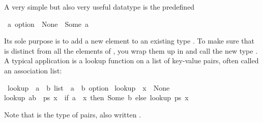 \begin{isabellebody}
\begin{isamarkuptxt}
A very simple but also very useful datatype is the predefined
\begin{isabelle}%
\ {}a\ option\ {}\ None\ {}\ Some\ {}a%
\end{isabelle}
Its sole purpose is to add a new element  to an existing
type . To make sure that  is distinct from all the
elements of , you wrap them up in  and call
the new type . A typical application is a lookup function
on a list of key-value pairs, often called an association list:%
\end{isamarkuptxt}%
\isamarkuptrue%
%
\endisatagproof
{\isafoldproof}%
%
\isadelimproof
%
\endisadelimproof
{}\isamarkupfalse%
\ lookup\ {}{}\ {}{}{}a\ {}\ {}b{}\ list\ {}\ {}a\ {}\ {}b\ option{}\ \isanewline
{}lookup\ {}{}\ x\ {}\ None{}\ {}\isanewline
{}lookup\ {}{}a{}b{}\ {}\ ps{}\ x\ {}\ {}if\ a\ {}\ x\ then\ Some\ b\ else\ lookup\ ps\ x{}{}%
\begin{isamarkuptext}%
Note that  is the type of pairs, also written .


\end{isamarkuptext}
\end{isabellebody}
